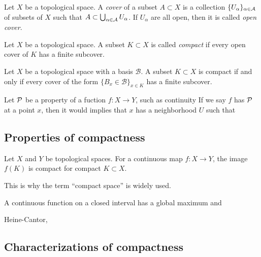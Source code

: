 \documentclass{../crs}
\begin{document}
\begin{defn}
Let $X$ be a topological space.
A \emph{cover} of a subset $A\subset X$ is a collection $\{U_\alpha\}_{\alpha\in\mathcal{A}}$ of subsets of $X$ such that $A\subset\bigcup_{\alpha\in\mathcal{A}}U_\alpha$.
If $U_\alpha$ are all open, then it is called \emph{open cover}.
\end{defn}
\begin{defn}
Let $X$ be a topological space.
A subset $K\subset X$ is called \emph{compact} if every open cover of $K$ has a finite subcover.
\end{defn}
\begin{prop}
Let $X$ be a topological space with a basis $\mathcal{B}$.
A subset $K\subset X$ is compact if and only if every cover of the form $\{B_x\in\mathcal{B}\}_{x\in K}$ has a finite subcover.
\end{prop}
\begin{rmk}
Let $\mathcal{P}$ be a property of a fuction $f\colon X\to Y$, such as continuity
If we say $f$ has $\mathcal{P}$ at a point $x$, then it would implies that $x$ has a neighborhood $U$ such that 
\end{rmk}

\subsection{Properties of compactness}
\begin{thm}
Let $X$ and $Y$ be topological spaces.
For a continuous map $f\colon X\to Y$, the image $f(K)$ is compact for compact $K\subset X$.
\end{thm}

\begin{rmk}
This is why the term ``compact space'' is widely used.
\end{rmk}

\begin{cor}
A continuous function on a closed interval has a global maximum and
\end{cor}

Heine-Cantor,



\subsection{Characterizations of compactness}
\end{document}
